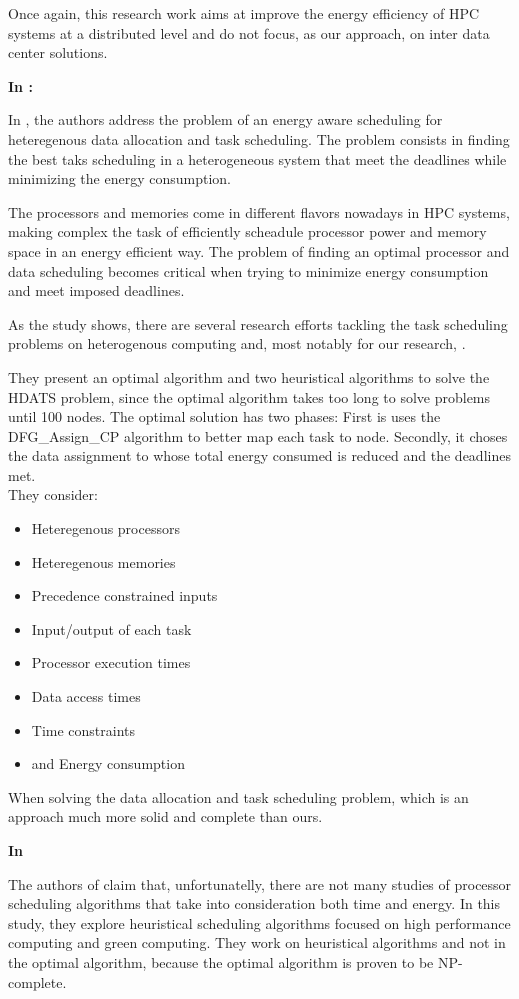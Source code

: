 Once again, this research work aims at improve the energy efficiency of HPC
systems at a distributed level and do not focus, as our approach, on inter data
center solutions.

 
\textbf{In \cite{TASK_SCHED}:}

In \cite{TASK_SCHED}, the authors address the problem of an energy aware
scheduling for heteregenous data allocation and task scheduling. The problem
consists in finding the best taks scheduling in a heterogeneous system that meet
the deadlines while minimizing the energy consumption.

The processors and memories come in different flavors nowadays in HPC
systems, making complex the task of efficiently scheadule processor power and 
memory space in an energy efficient way. The problem of finding an optimal
processor and data scheduling becomes critical when trying to minimize energy 
consumption and meet imposed deadlines.

As the study shows, there are several research efforts tackling the task
scheduling problems on heterogenous computing and, most notably for our
research, \cite{EFF_DSP}.

They present an optimal algorithm and two heuristical algorithms to solve the
HDATS problem, since the optimal algorithm takes too long to solve problems
until 100 nodes. The optimal solution has two phases: First is uses the
DFG\_Assign\_CP algorithm to better map each task to node. Secondly, it choses the
data assignment to whose total energy consumed is reduced and the deadlines met.
\\
They consider:
\begin{itemize}
  \item Heteregenous processors 
  \item Heteregenous memories
  \item Precedence constrained inputs
  \item Input/output of each task 
  \item Processor execution times
  \item Data access times
  \item Time constraints 
  \item and Energy consumption
\end{itemize}

When solving the data allocation and task scheduling problem, which is an
approach much more solid and complete than ours.


\textbf{In \cite{EXE_METHOD}}

The authors of \cite{EXE_METHOD} claim that, unfortunatelly, there are not many
studies of processor scheduling algorithms that take into consideration both
time and energy. In this study, they explore heuristical scheduling algorithms
focused on high performance computing and green computing. They work on
heuristical algorithms and not in the optimal algorithm, because the optimal
algorithm is proven to be NP-complete. 


